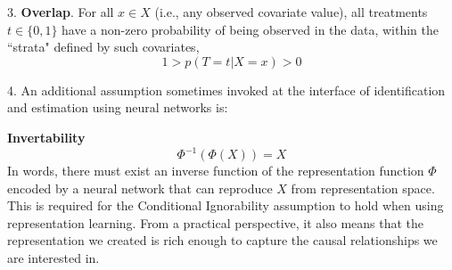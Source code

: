 3. \textbf{Overlap}. For all $x \in X$ (i.e., any observed covariate value), all treatments $t\in \{0,1\}$ have a non-zero probability of being observed in the data, within the ``strata" defined by such covariates, 
$$1 > p(T=t|X=x)  > 0$$

4. An additional assumption sometimes invoked at the interface of identification and estimation using neural networks is:

\textbf{Invertability}
$$\Phi^{-1}(\Phi(X)) = X$$
In words, there must exist an inverse function of the representation function $\Phi$ encoded by a neural network that can reproduce $X$ from representation space. This is required for the Conditional Ignorability assumption to hold when using representation learning. From a practical perspective, it also means that the representation we created is rich enough to capture the causal relationships we are interested in.

